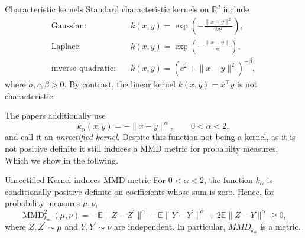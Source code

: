 \documentclass[12pt]{article}
\newcommand{\R}{\mathbb{R}}
\newcommand{\E}{\mathbb{E}}
\newcommand{\1}{\mathds{1}}
\newcommand{\MMD}{\operatorname{MMD}}
\newcommand{\norm}[1]{\lVert #1 \rVert}
\begin{document}
\begin{example}{Characteristic kernels}{}
Standard characteristic kernels on $\R^d$ include
\begin{align*}
  \text{Gaussian:}\quad
  &k(x,y)=\exp\!\left(-\frac{\norm{x-y}^2}{2\sigma^2}\right),\\
  \text{Laplace:}\quad
  &k(x,y)=\exp\!\left(-\frac{\norm{x-y}}{\sigma}\right),\\
  \text{inverse quadratic:}\quad
  &k(x,y)=\left(c^2+\norm{x-y}^2\right)^{-\beta},
\end{align*}
where $\sigma,c,\beta>0$. By contrast, the linear kernel
$k(x,y)=x^\top y$ is not characteristic.
\end{example}

The papers \cite{nguyen2020moment,sun2022regularized} additionally use
$$
  k_\alpha(x,y)=-\norm{x-y}^{\alpha},
  \qquad 0<\alpha<2,
$$
and call it an \emph{unrectified kernel}. 
Despite this function not being a kernel, as it is not positive definite it still induces a MMD metric for probabilty measures. Which we show in the follwing. 
\begin{theorem}{Unrectified Kernel induces MMD metric}{}
  For $0<\alpha<2$, the function $k_\alpha$ is conditionally positive definite on coefficients whose sum is zero. Hence, for probability measures $\mu,\nu$,
  $$
    \MMD_{k_\alpha}^2(\mu,\nu)
    =
    -\E\norm{Z-Z^{\prime}}^{\alpha}-\E\norm{Y-Y^{\prime}}^{\alpha}+2\E\norm{Z-Y}^{\alpha}
    \geq 0,
  $$
  where $Z,Z^{\prime}\sim\mu$ and $Y,Y^{\prime}\sim\nu$ are independent. In particular, $MMD_{k_\alpha}$ is a metric.
\end{theorem}
\end{document}
